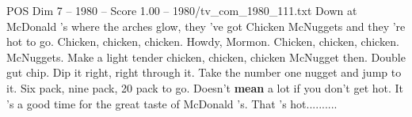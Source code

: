\begin{textsample}{POS Dim 7 – 1980 – Score 1.00 – 1980/tv\_com\_1980\_111.txt}  \label{ex:f7_pos_043}
Down at McDonald 's where the arches glow, they 've got Chicken McNuggets and they 're hot to go.
Chicken, chicken, chicken.
Howdy, Mormon.
Chicken, chicken, chicken.
McNuggets.
Make a light tender chicken, chicken, chicken McNugget then.
Double gut chip.
Dip it right, right through it.
Take the number one nugget and jump to it.
Six pack, nine pack, 20 pack to go.
Doesn't \textbf{mean} a lot if you don't get hot.
It 's a good time for the great taste of McDonald 's.
That 's hot..........

\end{textsample}
